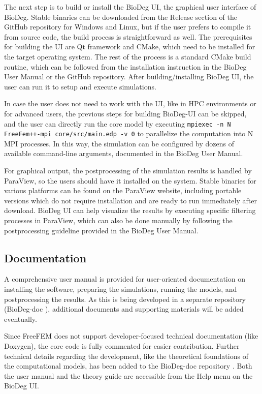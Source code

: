 The next step is to build or install the BioDeg UI, the graphical user interface of BioDeg. Stable binaries can be downloaded from the Release section of the GitHub repository for Windows and Linux, but if the user prefers to compile it from source code, the build process is straightforward as well. The prerequisites for building the UI are Qt framework and CMake, which need to be installed for the target operating system. The rest of the process is a standard CMake build routine, which can be followed from the installation instruction in the BioDeg User Manual or the GitHub repository. After building/installing BioDeg UI, the user can run it to setup and execute simulations.

In case the user does not need to work with the UI, like in \gls{HPC} environments or for advanced users, the previous steps for building BioDeg-UI can be skipped, and the user can directly run the core model by executing \texttt{mpiexec -n N FreeFem++-mpi core/src/main.edp -v 0} to parallelize the computation into N \gls{MPI} processes. In this way, the simulation can be configured by dozens of available command-line arguments, documented in the BioDeg User Manual.

For graphical output, the postprocessing of the simulation results is handled by ParaView, so the users should have it installed on the system. Stable binaries for various platforms can be found on the ParaView website, including portable versions which do not require installation and are ready to run immediately after download. BioDeg UI can help visualize the results by executing specific filtering processes in ParaView, which can also be done manually by following the postprocessing guideline provided in the BioDeg User Manual.

\subsection{Documentation}

A comprehensive user manual is provided for user-oriented documentation on installing the software, preparing the simulations, running the models, and postprocessing the results. As this is being developed in a separate repository (BioDeg-doc \cite{BioDegDoc}), additional documents and supporting materials will be added eventually.

Since FreeFEM does not support developer-focused technical documentation (like Doxygen), the core code is fully commented for easier contribution. Further technical details regarding the development, like the theoretical foundations of the computational models, has been added to the BioDeg-doc repository \cite{BioDegDoc}. Both the user manual and the theory guide are accessible from the Help menu on the BioDeg UI.

